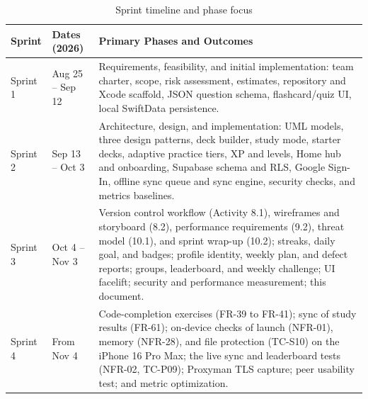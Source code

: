 \documentclass[12pt,letterpaper]{article}
\begin{document}
\begin{table}[H]
\centering
\caption{Sprint timeline and phase focus}
\label{tab:timeline}
\begin{tabularx}{\textwidth}{@{}l L{3.6cm} Y@{}}
\toprule
\textbf{Sprint} & \textbf{Dates (2026)} & \textbf{Primary Phases and Outcomes} \\
\midrule
Sprint 1 & Aug 25 -- Sep 12 & Requirements, feasibility, and initial implementation: team charter, scope, risk assessment, estimates, repository and Xcode scaffold, JSON question schema, flashcard/quiz UI, local SwiftData persistence. \\
Sprint 2 & Sep 13 -- Oct 3 & Architecture, design, and implementation: UML models, three design patterns, deck builder, study mode, starter decks, adaptive practice tiers, XP and levels, Home hub and onboarding, Supabase schema and RLS, Google Sign-In, offline sync queue and sync engine, security checks, and metrics baselines. \\
Sprint 3 & Oct 4 -- Nov 3 & Version control workflow (Activity 8.1), wireframes and storyboard (8.2), performance requirements (9.2), threat model (10.1), and sprint wrap-up (10.2); streaks, daily goal, and badges; profile identity, weekly plan, and defect reports; groups, leaderboard, and weekly challenge; UI facelift; security and performance measurement; this document. \\
Sprint 4 & From Nov 4 & Code-completion exercises (FR-39 to FR-41); sync of study results (FR-61); on-device checks of launch (NFR-01), memory (NFR-28), and file protection (TC-S10) on the iPhone 16 Pro Max; the live sync and leaderboard tests (NFR-02, TC-P09); Proxyman TLS capture; peer usability test; and metric optimization. \\
\bottomrule
\end{tabularx}
\end{table}
\end{document}
